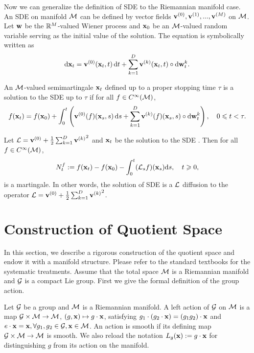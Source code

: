 Now we can generalize the definition of SDE to the Riemannian manifold case. An SDE on manifold $\mathcal{M}$ can be defined by vector fields $\mathbf{v}^{(0)},\mathbf{v}^{(1)},...,\mathbf{v}^{(M)}$ on $\mathcal{M}$. Let $\mathbf{w}$ be the $\mathbb{R}^M$-valued Wiener process and $\mathbf{x}_0$ be an $\mathcal{M}$-valued random variable serving as the initial value of the solution. The equation is symbolically written as
\begin{align}\label{eqn:sde-manifold}
    \mathrm{d}\mathbf{x}_t=\mathbf{v}^{(0)}(\mathbf{x}_t,t) \,\mathrm{d} t+\sum_{k=1}^D \mathbf{v}^{(k)}(\mathbf{x}_t,t) \circ \mathrm{d} \mathbf{w}_t^k.
\end{align}
\begin{definition}\label{def:sde-RM}
    An $\mathcal{M}$-valued semimartingale $\mathbf{x}_t$ defined up to a proper stopping time $\tau$ is a solution to the SDE  up to $\tau$ if for all $f\in C^\infty(\mathcal{M})$,
    \begin{align}
        f(\mathbf{x}_t)=f(\mathbf{x}_0)+\int_0^t\left(\mathbf{v}^{(0)}(f)(\mathbf{x}_s,s)\,\mathrm{d} s + \sum_{k=1}^D\mathbf{v}^{(k)}(f)(\mathbf{x}_s,s) \circ \mathrm{d} \mathbf{w}_t^k \right), \quad 0\leqslant t<\tau.
    \end{align}
\end{definition}
\begin{proposition}\label{prop:sde-generator-RM}
    \citep[Cor.~1.2.19]{thalmaier2023stochastic} Let $\mathcal{L}=\mathbf{v}^{(0)}+\frac{1}{2}\sum_{k=1}^D {\mathbf{v}^{(k)}}^2$ and $\mathbf{x}_t$ be the solution to the SDE . Then for all $f\in C^\infty(\mathcal{M})$,
    \begin{align}
        N_t^f:=f(\mathbf{x}_t)-f(\mathbf{x}_0)-\int_0^t(\mathcal{L}_sf)(\mathbf{x}_s)\mathrm{d} s, \quad t\geqslant0,
    \end{align}
    is a martingale. In other words, the  solution of SDE  is a $\mathcal{L}$ diffusion to the operator $\mathcal{L}=\mathbf{v}^{(0)}+\frac{1}{2} \sum_{k=1}^D {\mathbf{v}^{(k)}}^2$.
\end{proposition}

\section{Construction of Quotient Space}\label{appx:rigorous-construction}
In this section, we describe a rigorous construction of the quotient space and endow it with a manifold structure. Please refer to the standard textbooks \citet{lee2018introduction} for the systematic treatments.
Assume that the total space $\mathcal{M}$ is a Riemannian manifold and $\mathcal{G}$ is a compact Lie group. First we give the formal definition of the group action.
\begin{definition}
    Let $\mathcal{G}$ be a group and $\mathcal{M}$ is a Riemannian manifold. A left action of $\mathcal{G}$ on $\mathcal{M}$ is a map $\mathcal{G}\times\mathcal{M}\to\mathcal{M}$, $(g,\mathbf{x})\mapsto g\cdot \mathbf{x}$, satisfying $g_1\cdot(g_2\cdot\mathbf{x})=(g_1g_2)\cdot\mathbf{x}$ and $e \cdot\mathbf{x}=\mathbf{x}, \forall g_1,g_2\in \mathcal{G}, \mathbf{x}\in\mathcal{M}$. An action is smooth if its defining map $\mathcal{G}\times\mathcal{M}\to\mathcal{M}$ is smooth.
    We also reload the notation $L_g(\mathbf{x}) := g \cdot \mathbf{x}$ for distinguishing $g$ from its action on the manifold.
\end{definition}

